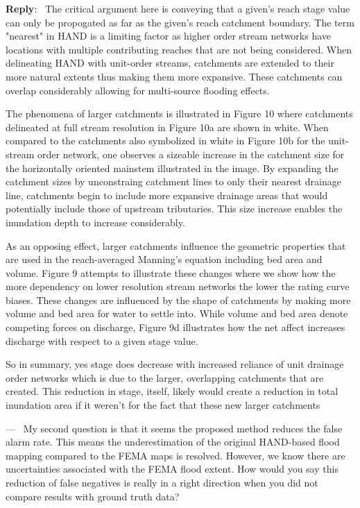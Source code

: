 \documentclass[11pt]{article}
\newcounter{reviewer}
\newcounter{point}[reviewer]
\renewcommand{\thepoint}{P\,\thereviewer.\arabic{point}}
\newenvironment{point}
   {\refstepcounter{point} \bigskip \noindent {\textbf{Reviewer~Point~\thepoint} } ---\ }
   {\par }
\newenvironment{reply}
   {\medskip \noindent \begin{sf}\textbf{Reply}:\  }
   {\medskip \end{sf}}
\begin{document}
\begin{reply}
The critical argument here is conveying that a given's reach stage value can only be propogated as far as the given's reach catchment boundary. 
The term "nearest" in HAND is a limiting factor as higher order stream networks have locations with multiple contributing reaches that are not being considered.
When delineating HAND with unit-order streams, catchments are extended to their more natural extents thus making them more expansive.
These catchments can overlap considerably allowing for multi-source flooding effects.

The phenomena of larger catchments is illustrated in Figure 10 where catchments delineated at full stream resolution in Figure 10a are shown in white.
When compared to the catchments also symbolized in white in Figure 10b for the unit-stream order network, one observes a sizeable increase in the catchment size for the horizontally oriented mainstem illustrated in the image.
By expanding the catchment sizes by unconstraing catchment lines to only their nearest drainage line, catchments begin to include more expansive drainage areas that would potentially include those of upstream tributaries.
This size increase enables the inundation depth to increase considerably.

As an opposing effect, larger catchments influence the geometric properties that are used in the reach-averaged Manning's equation including bed area and volume.
Figure 9 attempts to illustrate these changes where we show how the more dependency on lower resolution stream networks the lower the rating curve biases.
These changes are influenced by the shape of catchments by making more volume and bed area for water to settle into.
While volume and bed area denote competing forces on discharge, Figure 9d illustrates how the net affect increases discharge with respect to a given stage value. 

So in summary, yes stage does decrease with increased reliance of unit drainage order networks which is due to the larger, overlapping catchments that are created.
This reduction in stage, itself, likely would create a reduction in total inundation area if it weren't for the fact that these new larger catchments 
\end{reply}

\begin{point}
My second question is that it seems the proposed method reduces the false alarm rate.
This means the underestimation of the original HAND-based flood mapping compared to the FEMA maps is resolved.
However, we know there are uncertainties associated with the FEMA flood extent.
How would you say this reduction of false negatives is really in a right direction when you did not compare results with ground truth data?
    \label{pt:bar}
\end{point}
\end{document}
